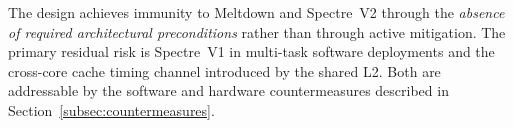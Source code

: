 The design achieves immunity to Meltdown and Spectre~V2 through the \emph{absence of
required architectural preconditions} rather than through active mitigation.  The
primary residual risk is Spectre~V1 in multi-task software deployments and the
cross-core cache timing channel introduced by the shared \mbox{L2}.  Both are
addressable by the software and hardware countermeasures described in
Section~\ref{subsec:countermeasures}.


%
%
%
%
%
%
